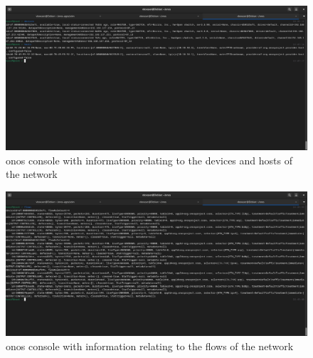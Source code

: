 \begin{figure}
	\centering
	\includegraphics[width=\textwidth]{Chapters/Figures/tests/ovs_phase_4/onos_topology.PNG}
	\caption{\gls{onos} console with information relating to the devices and hosts of the network}
	\label{fig:exp1_phase4_onos}
\end{figure}

\begin{figure}
	\centering
	\includegraphics[width=\textwidth]{Chapters/Figures/tests/ovs_phase_4/onos_flows.PNG}
	\caption{\gls{onos} console with information relating to the flows of the network}
	\label{fig:exp1_phase4_onos_flows}
\end{figure}

